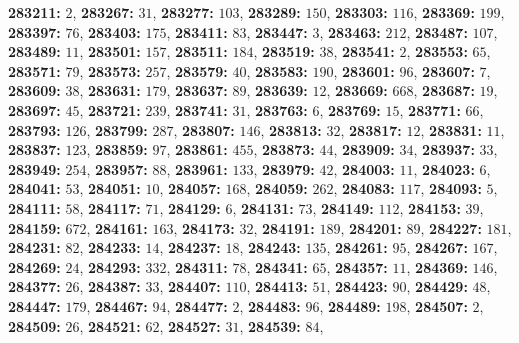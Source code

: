 \textsf{\bfseries 283211:} $2$, \textsf{\bfseries 283267:} $31$, \textsf{\bfseries 283277:} $103$, \textsf{\bfseries 283289:} $150$, \textsf{\bfseries 283303:} $116$, \textsf{\bfseries 283369:} $199$, \textsf{\bfseries 283397:} $76$, \textsf{\bfseries 283403:} $175$, \textsf{\bfseries 283411:} $83$, \textsf{\bfseries 283447:} $3$, \textsf{\bfseries 283463:} $212$, \textsf{\bfseries 283487:} $107$, \textsf{\bfseries 283489:} $11$, \textsf{\bfseries 283501:} $157$, \textsf{\bfseries 283511:} $184$, \textsf{\bfseries 283519:} $38$, \textsf{\bfseries 283541:} $2$, \textsf{\bfseries 283553:} $65$, \textsf{\bfseries 283571:} $79$, \textsf{\bfseries 283573:} $257$, \textsf{\bfseries 283579:} $40$, \textsf{\bfseries 283583:} $190$, \textsf{\bfseries 283601:} $96$, \textsf{\bfseries 283607:} $7$, \textsf{\bfseries 283609:} $38$, \textsf{\bfseries 283631:} $179$, \textsf{\bfseries 283637:} $89$, \textsf{\bfseries 283639:} $12$, \textsf{\bfseries 283669:} $668$, \textsf{\bfseries 283687:} $19$, \textsf{\bfseries 283697:} $45$, \textsf{\bfseries 283721:} $239$, \textsf{\bfseries 283741:} $31$, \textsf{\bfseries 283763:} $6$, \textsf{\bfseries 283769:} $15$, \textsf{\bfseries 283771:} $66$, \textsf{\bfseries 283793:} $126$, \textsf{\bfseries 283799:} $287$, \textsf{\bfseries 283807:} $146$, \textsf{\bfseries 283813:} $32$, \textsf{\bfseries 283817:} $12$, \textsf{\bfseries 283831:} $11$, \textsf{\bfseries 283837:} $123$, \textsf{\bfseries 283859:} $97$, \textsf{\bfseries 283861:} $455$, \textsf{\bfseries 283873:} $44$, \textsf{\bfseries 283909:} $34$, \textsf{\bfseries 283937:} $33$, \textsf{\bfseries 283949:} $254$, \textsf{\bfseries 283957:} $88$, \textsf{\bfseries 283961:} $133$, \textsf{\bfseries 283979:} $42$, \textsf{\bfseries 284003:} $11$, \textsf{\bfseries 284023:} $6$, \textsf{\bfseries 284041:} $53$, \textsf{\bfseries 284051:} $10$, \textsf{\bfseries 284057:} $168$, \textsf{\bfseries 284059:} $262$, \textsf{\bfseries 284083:} $117$, \textsf{\bfseries 284093:} $5$, \textsf{\bfseries 284111:} $58$, \textsf{\bfseries 284117:} $71$, \textsf{\bfseries 284129:} $6$, \textsf{\bfseries 284131:} $73$, \textsf{\bfseries 284149:} $112$, \textsf{\bfseries 284153:} $39$, \textsf{\bfseries 284159:} $672$, \textsf{\bfseries 284161:} $163$, \textsf{\bfseries 284173:} $32$, \textsf{\bfseries 284191:} $189$, \textsf{\bfseries 284201:} $89$, \textsf{\bfseries 284227:} $181$, \textsf{\bfseries 284231:} $82$, \textsf{\bfseries 284233:} $14$, \textsf{\bfseries 284237:} $18$, \textsf{\bfseries 284243:} $135$, \textsf{\bfseries 284261:} $95$, \textsf{\bfseries 284267:} $167$, \textsf{\bfseries 284269:} $24$, \textsf{\bfseries 284293:} $332$, \textsf{\bfseries 284311:} $78$, \textsf{\bfseries 284341:} $65$, \textsf{\bfseries 284357:} $11$, \textsf{\bfseries 284369:} $146$, \textsf{\bfseries 284377:} $26$, \textsf{\bfseries 284387:} $33$, \textsf{\bfseries 284407:} $110$, \textsf{\bfseries 284413:} $51$, \textsf{\bfseries 284423:} $90$, \textsf{\bfseries 284429:} $48$, \textsf{\bfseries 284447:} $179$, \textsf{\bfseries 284467:} $94$, \textsf{\bfseries 284477:} $2$, \textsf{\bfseries 284483:} $96$, \textsf{\bfseries 284489:} $198$, \textsf{\bfseries 284507:} $2$, \textsf{\bfseries 284509:} $26$, \textsf{\bfseries 284521:} $62$, \textsf{\bfseries 284527:} $31$, \textsf{\bfseries 284539:} $84$, 
